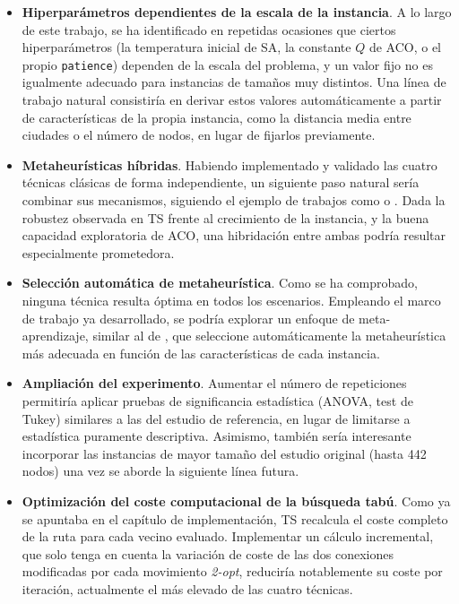\begin{itemize}
  \item \textbf{Hiperparámetros dependientes de la escala de la instancia}. A lo largo de este trabajo, se ha identificado
  en repetidas ocasiones que ciertos hiperparámetros (la temperatura inicial de SA, la constante $Q$ de ACO, o el propio
  \texttt{patience}) dependen de la escala del problema, y un valor fijo no es igualmente adecuado para instancias de
  tamaños muy distintos. Una línea de trabajo natural consistiría en derivar estos valores automáticamente a partir de
  características de la propia instancia, como la distancia media entre ciudades o el número de nodos, en lugar de fijarlos
  previamente.

  \item \textbf{Metaheurísticas híbridas}. Habiendo implementado y validado las cuatro técnicas clásicas de forma
  independiente, un siguiente paso natural sería combinar sus mecanismos, siguiendo el ejemplo de trabajos como
  \cite{jingyan2012} o \cite{xu2023}. Dada la robustez observada en TS frente al crecimiento de la instancia, y la buena
  capacidad exploratoria de ACO, una hibridación entre ambas podría resultar especialmente prometedora.

  \item \textbf{Selección automática de metaheurística}. Como se ha comprobado, ninguna técnica resulta óptima en todos
  los escenarios. Empleando el marco de trabajo ya desarrollado, se podría explorar un enfoque de meta-aprendizaje, similar
  al de \cite{kanda2016}, que seleccione automáticamente la metaheurística más adecuada en función de las características
  de cada instancia.

  \item \textbf{Ampliación del experimento}. Aumentar el número de repeticiones permitiría aplicar pruebas de significancia 
  estadística (ANOVA, test de Tukey) similares a las del estudio de referencia, en lugar de limitarse a estadística puramente
  descriptiva. Asimismo, también sería interesante incorporar las instancias de mayor tamaño del estudio original (hasta 442 
  nodos) una vez se aborde la siguiente línea futura.

  \item \textbf{Optimización del coste computacional de la búsqueda tabú}. Como ya se apuntaba en el capítulo de
  implementación, TS recalcula el coste completo de la ruta para cada vecino evaluado. Implementar un cálculo incremental,
  que solo tenga en cuenta la variación de coste de las dos conexiones modificadas por cada movimiento \textit{2-opt},
  reduciría notablemente su coste por iteración, actualmente el más elevado de las cuatro técnicas.


\end{itemize}
